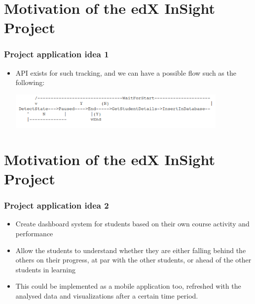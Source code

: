 \documentclass[12pt,xcolor=dvipsnames]{beamer}
\begin{document}
\section{Motivation of the edX InSight Project}
\begin{frame}[t]
\frametitle{Project application idea 1}
\hfill
\hfill
\begin{itemize}
\item API exists for such tracking, and we can have a possible flow such as the following:
\hfill
\begin{center}
\includegraphics[height=1.8cm]{Diag1.png}\\ %
\end{center}

\end{itemize}

\end{frame}

\section{Motivation of the edX InSight Project}
\begin{frame}[t]
\frametitle{Project application idea 2}

\begin{itemize}
\item Create dashboard system for students based on their own course activity and performance
\item Allow the students to understand whether they are either falling behind the others on their progress, at par with the other students, or ahead of the other students in learning
\item This could be implemented as a mobile application too, refreshed with the analysed data and visualizations after a certain time period.
\end{itemize}
\end{frame}

\end{document}
